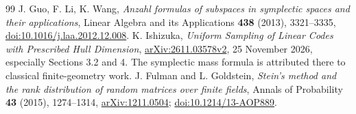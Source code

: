 \documentclass[11pt]{article}
\newcommand{\1}{\mathbf 1}
\theoremstyle{definition}
\theoremstyle{remark}
\numberwithin{equation}{section}
\begin{document}
\begin{thebibliography}{99}
 J. Guo, F. Li, K. Wang,
\emph{Anzahl formulas of subspaces in symplectic spaces and their applications},
Linear Algebra and its Applications \textbf{438} (2013), 3321--3335,
\href{https://doi.org/10.1016/j.laa.2012.12.008}{doi:10.1016/j.laa.2012.12.008}.
 K. Ishizuka,
\emph{Uniform Sampling of Linear Codes with Prescribed Hull Dimension},
\href{https://arxiv.org/html/2611.03578v2}{arXiv:2611.03578v2}, 25 November 2026, especially Sections 3.2 and 4. The symplectic mass formula is attributed there to classical finite-geometry work.
 J. Fulman and L. Goldstein,
\emph{Stein's method and the rank distribution of random matrices over finite fields},
Annals of Probability \textbf{43} (2015), 1274--1314,
\href{https://arxiv.org/abs/1211.0504}{arXiv:1211.0504};
\href{https://doi.org/10.1214/13-AOP889}{doi:10.1214/13-AOP889}.
\end{thebibliography}
\end{document}
